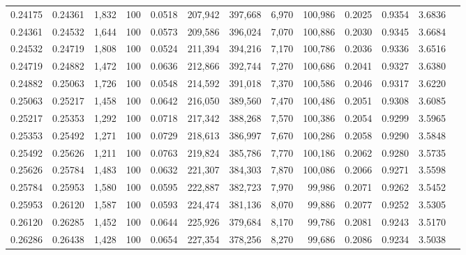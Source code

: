 \begin{tabular}{rrrrrrrrrrrrr}
0.24175 & 0.24361 & 1,832 & 100 &                                     0.0518 & 207,942 & 397,668 &   6,970 & 100,986 & 0.2025 & 0.9354 & 3.6836 \\
0.24361 & 0.24532 & 1,644 & 100 &                                     0.0573 & 209,586 & 396,024 &   7,070 & 100,886 & 0.2030 & 0.9345 & 3.6684 \\
0.24532 & 0.24719 & 1,808 & 100 &                                     0.0524 & 211,394 & 394,216 &   7,170 & 100,786 & 0.2036 & 0.9336 & 3.6516 \\
0.24719 & 0.24882 & 1,472 & 100 &                                     0.0636 & 212,866 & 392,744 &   7,270 & 100,686 & 0.2041 & 0.9327 & 3.6380 \\
0.24882 & 0.25063 & 1,726 & 100 &                                     0.0548 & 214,592 & 391,018 &   7,370 & 100,586 & 0.2046 & 0.9317 & 3.6220 \\
0.25063 & 0.25217 & 1,458 & 100 &                                     0.0642 & 216,050 & 389,560 &   7,470 & 100,486 & 0.2051 & 0.9308 & 3.6085 \\
0.25217 & 0.25353 & 1,292 & 100 &                                     0.0718 & 217,342 & 388,268 &   7,570 & 100,386 & 0.2054 & 0.9299 & 3.5965 \\
0.25353 & 0.25492 & 1,271 & 100 &                                     0.0729 & 218,613 & 386,997 &   7,670 & 100,286 & 0.2058 & 0.9290 & 3.5848 \\
0.25492 & 0.25626 & 1,211 & 100 &                                     0.0763 & 219,824 & 385,786 &   7,770 & 100,186 & 0.2062 & 0.9280 & 3.5735 \\
0.25626 & 0.25784 & 1,483 & 100 &                                     0.0632 & 221,307 & 384,303 &   7,870 & 100,086 & 0.2066 & 0.9271 & 3.5598 \\
0.25784 & 0.25953 & 1,580 & 100 &                                     0.0595 & 222,887 & 382,723 &   7,970 &  99,986 & 0.2071 & 0.9262 & 3.5452 \\
0.25953 & 0.26120 & 1,587 & 100 &                                     0.0593 & 224,474 & 381,136 &   8,070 &  99,886 & 0.2077 & 0.9252 & 3.5305 \\
0.26120 & 0.26285 & 1,452 & 100 &                                     0.0644 & 225,926 & 379,684 &   8,170 &  99,786 & 0.2081 & 0.9243 & 3.5170 \\
0.26286 & 0.26438 & 1,428 & 100 &                                     0.0654 & 227,354 & 378,256 &   8,270 &  99,686 & 0.2086 & 0.9234 & 3.5038 \\

\end{tabular}
